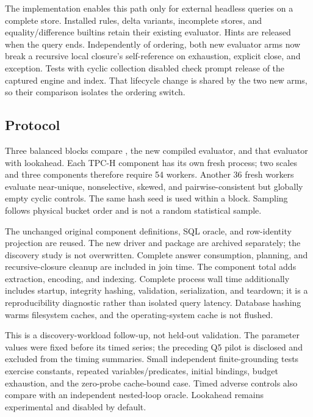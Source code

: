 The implementation enables this path only for external headless queries on a
complete store. Installed rules, delta variants, incomplete stores, and
equality/difference builtins retain their existing evaluator. Hints are released
when the query ends. Independently of ordering, both new evaluator arms now
break a recursive local closure's self-reference on exhaustion, explicit close,
and exception. Tests with cyclic collection disabled check prompt release of
the captured engine and index. That lifecycle change is shared by the two new
arms, so their comparison isolates the ordering switch.

\subsection{Protocol}
Three balanced blocks compare , the new compiled evaluator, and
that evaluator with lookahead. Each TPC-H component has its own fresh process;
two scales and three components therefore require 54 workers. Another 36
fresh workers evaluate near-unique, nonselective, skewed, and pairwise-consistent
but globally empty cyclic controls. The same hash seed is used within a block.
Sampling follows physical bucket order and is not a random statistical sample.

The unchanged original component definitions, SQL oracle, and row-identity
projection are reused. The new driver and package are archived separately;
the discovery study is not overwritten. Complete answer consumption, planning,
and recursive-closure cleanup are included in join time. The component total
adds extraction, encoding, and indexing. Complete process wall time additionally
includes startup, integrity hashing, validation, serialization, and teardown;
it is a reproducibility diagnostic rather than isolated query latency. Database
hashing warms filesystem caches, and the operating-system cache is not flushed.

This is a discovery-workload follow-up, not held-out validation. The parameter
values were fixed before its timed series; the preceding Q5 pilot is disclosed
and excluded from the timing summaries. Small independent finite-grounding
tests exercise constants, repeated variables/predicates, initial bindings,
budget exhaustion, and the zero-probe cache-bound case. Timed adverse controls
also compare with an independent nested-loop oracle. Lookahead remains
experimental and disabled by default.




